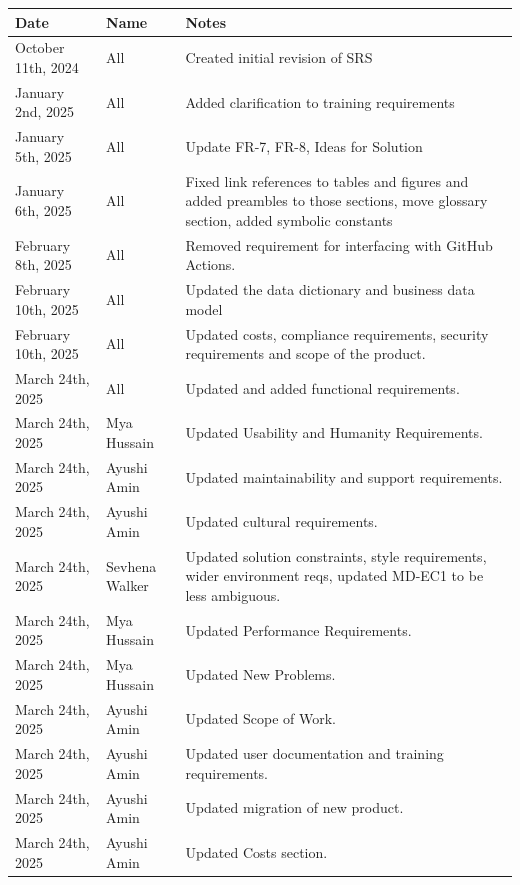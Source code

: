 \documentclass[12pt]{article}
\begin{document}
\begin{tabularx}{\textwidth}{p{3.7cm}>{\raggedright\arraybackslash}p{1.8cm}X}
  \toprule {\textbf{Date}} & {\textbf{Name}} & {\textbf{Notes}}\\
  \midrule
  October 11th, 2024 & All & Created initial revision of SRS\\
  January 2nd, 2025 & All & Added clarification to training requirements\\
  January 5th, 2025 & All & Update FR-7, FR-8, Ideas for Solution \\
  January 6th, 2025 & All & Fixed link references to tables and
  figures and added preambles to those sections, move glossary
  section, added symbolic constants\\
  February 8th, 2025 & All & Removed requirement for interfacing with
  GitHub Actions.\\
  February 10th, 2025 & All & Updated the data dictionary and
  business data model \\
  February 10th, 2025 & All & Updated costs, compliance requirements,
  security requirements and scope of the product. \\
  March 24th, 2025 & All & Updated and added functional requirements. \\
  March 24th, 2025 & Mya Hussain & Updated Usability and Humanity Requirements. \\
  March 24th, 2025 & Ayushi Amin & Updated maintainability and support requirements. \\
  March 24th, 2025 & Ayushi Amin & Updated cultural requirements. \\
  March 24th, 2025 & Sevhena Walker & Updated solution constraints, style requirements, wider environment reqs, updated MD-EC1 to be less ambiguous. \\
  March 24th, 2025 & Mya Hussain & Updated Performance Requirements. \\
  March 24th, 2025 & Mya Hussain & Updated New Problems. \\
  March 24th, 2025 & Ayushi Amin & Updated Scope of Work. \\
  March 24th, 2025 & Ayushi Amin & Updated user documentation and training requirements. \\
  March 24th, 2025 & Ayushi Amin & Updated migration of new product. \\
  March 24th, 2025 & Ayushi Amin & Updated Costs section. \\
  \bottomrule 
\end{tabularx}
\end{document}
